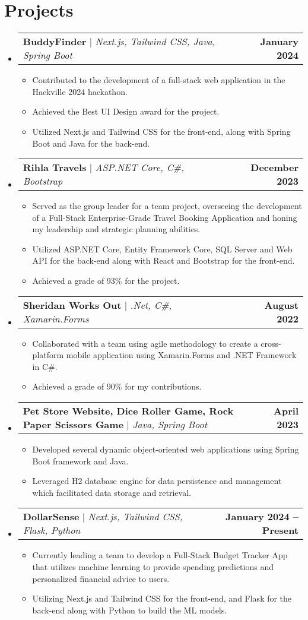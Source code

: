 \documentclass[letterpaper,11pt]{article}
\makeatletter
\newcommand{\resumeItem}[1]{
  \item\small{
    {#1 \vspace{-2pt}}
  }
}
\newcommand{\resumeProjectHeading}[2]{
    \item
    \begin{tabular*}{1.001\textwidth}{l@{\extracolsep{\fill}}r}
      \small#1 & \textbf{\small #2}\\
    \end{tabular*}\vspace{-7pt}
}
\newcommand{\resumeSubHeadingListStart}{\begin{itemize}[leftmargin=0.0in, label={}]}
\newcommand{\resumeSubHeadingListEnd}{\end{itemize}}
\newcommand{\resumeItemListStart}{\begin{itemize}}
\newcommand{\resumeItemListEnd}{\end{itemize}\vspace{-5pt}}
\makeatother
\begin{document}
\section{Projects}
    \vspace{-5pt}
    \resumeSubHeadingListStart
      \resumeProjectHeading
          {\textbf{BuddyFinder} $|$ \emph{Next.js, Tailwind CSS, Java, Spring Boot}}{January 2024}
          \resumeItemListStart
            \resumeItem{Contributed to the development of a full-stack web application in the Hackville 2024 hackathon.}
            \resumeItem{Achieved the Best UI Design award for the project.}
            \resumeItem{Utilized Next.js and Tailwind CSS for the front-end, along with Spring Boot and Java for the back-end.}
          \resumeItemListEnd
          \vspace{-13pt}
      \resumeProjectHeading
          {\textbf{Rihla Travels} $|$ \emph{ASP.NET Core, C\#, Bootstrap}}{December 2023}
          \resumeItemListStart
            \resumeItem{Served as the group leader for a team project, overseeing the development of a Full-Stack Enterprise-Grade Travel Booking Application and honing my leadership and strategic planning abilities.}
            \resumeItem{Utilized ASP.NET Core, Entity Framework Core, SQL Server and Web API for the back-end along with React and Bootstrap for the front-end.}
            \resumeItem{Achieved a grade of 93\% for the project.}
          \resumeItemListEnd
          \vspace{-13pt}
      \resumeProjectHeading
          {\textbf{Sheridan Works Out} $|$ \emph{.Net, C\#, Xamarin.Forms}}{August 2022}
          \resumeItemListStart
            \resumeItem{Collaborated with a team using agile methodology to create a cross-platform mobile application using Xamarin.Forms and .NET Framework in C\#.}
            \resumeItem{Achieved a grade of 90\% for my contributions.}
          \resumeItemListEnd
          \vspace{-13pt}
      \resumeProjectHeading
          {\textbf{Pet Store Website, Dice Roller Game, Rock Paper Scissors Game} $|$ \emph{Java, Spring Boot}}{April 2023}
          \resumeItemListStart
            \resumeItem{Developed several dynamic object-oriented web applications using Spring Boot framework and Java.}
            \resumeItem{Leveraged H2 database engine for data persistence and management which facilitated data storage and retrieval.}
          \resumeItemListEnd
          \vspace{-13pt}
      \resumeProjectHeading
          {\textbf{DollarSense} $|$ \emph{Next.js, Tailwind CSS, Flask, Python}}{January 2024 -- Present}
          \resumeItemListStart
            \resumeItem{Currently leading a team to develop a Full-Stack Budget Tracker App that utilizes machine learning to provide spending predictions and personalized financial advice to users.}
            \resumeItem{Utilizing Next.js and Tailwind CSS for the front-end, and Flask for the back-end along with Python to build the ML models.}
          \resumeItemListEnd
    \resumeSubHeadingListEnd
\vspace{-16pt}
\end{document}
